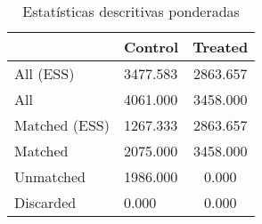 \begin{table}

\caption{\label{tab:PSM}Estatísticas descritivas ponderadas}
\centering
\begin{tabular}[t]{llc}
\toprule
  & Control & Treated\\
\midrule
All (ESS) & 3477.583 & 2863.657\\
All & 4061.000 & 3458.000\\
Matched (ESS) & 1267.333 & 2863.657\\
Matched & 2075.000 & 3458.000\\
Unmatched & 1986.000 & 0.000\\
\addlinespace
Discarded & 0.000 & 0.000\\
\bottomrule
\end{tabular}
\end{table}
